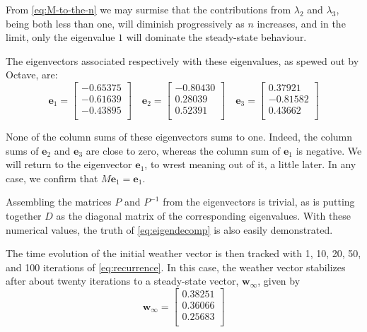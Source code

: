 \documentclass[
  11pt,
  british,
  a4paper,
]{article}
\begin{document}
From \cref{eq:M-to-the-n} we may surmise that the contributions from
\(\lambda_{2}\) and \(\lambda_{3}\), being both less than one, will
diminish progressively as \(n\) increases, and in the limit, only the
eigenvalue \(1\) will dominate the steady-state behaviour.

The eigenvectors associated respectively with these eigenvalues, as
spewed out by Octave, are: \[
\symbf{e}_{1} = \begin{bmatrix}
-0.65375\\
-0.61639\\
-0.43895\\
\end{bmatrix}
\quad
\symbf{e}_{2} = \begin{bmatrix}
-0.80430\\
0.28039\\
0.52391\\
\end{bmatrix}
\quad
\symbf{e}_{3} = \begin{bmatrix}
0.37921\\
-0.81582\\
0.43662\\
\end{bmatrix}
\]

None of the column sums of these eigenvectors sums to one. Indeed, the
column sums of \(\symbf{e}_{2}\) and \(\symbf{e}_{3}\) are close to
zero, whereas the column sum of \(\symbf{e}_{1}\) is negative. We will
return to the eigenvector \(\symbf{e}_{1}\), to wrest meaning out of it,
a little later. In any case, we confirm that
\(M\symbf{e}_{1} = \symbf{e}_{1}\).

Assembling the matrices \(P\) and \(P^{-1}\) from the eigenvectors is
trivial, as is putting together \(D\) as the diagonal matrix of the
corresponding eigenvalues. With these numerical values, the truth of
\cref{eq:eigendecomp} is also easily demonstrated.

The time evolution of the initial weather vector is then tracked with 1,
10, 20, 50, and 100 iterations of \cref{eq:recurrence}. In this case,
the weather vector stabilizes after about twenty iterations to a
steady-state vector, \(\symbf{w}_{\infty}\), given by \begin{equation}
\symbf{w}_{\infty} = \begin{bmatrix}
0.38251\\
0.36066\\
0.25683\\
\end{bmatrix}
\label{eq:steady-state}\end{equation}
\end{document}

